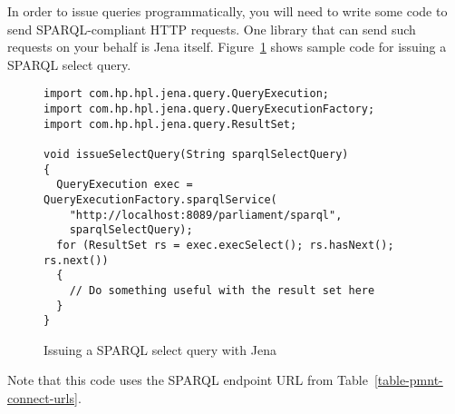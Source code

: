 In order to issue queries programmatically, you will need to write some code to send SPARQL-compliant HTTP requests.  One library that can send such requests on your behalf is Jena itself.  Figure~\ref{figure-sparql-select-query-with-jena} shows sample code for issuing a SPARQL select query.
\begin{figure}[htbp]
	\footnotesize
	\begin{verbatim}
import com.hp.hpl.jena.query.QueryExecution;
import com.hp.hpl.jena.query.QueryExecutionFactory;
import com.hp.hpl.jena.query.ResultSet;

void issueSelectQuery(String sparqlSelectQuery)
{
  QueryExecution exec = QueryExecutionFactory.sparqlService(
    "http://localhost:8089/parliament/sparql",
    sparqlSelectQuery);
  for (ResultSet rs = exec.execSelect(); rs.hasNext(); rs.next())
  {
    // Do something useful with the result set here
  }
}
	\end{verbatim}
	\caption{Issuing a SPARQL select query with Jena}
	\label{figure-sparql-select-query-with-jena}
\end{figure}
Note that this code uses the SPARQL endpoint URL from Table~\ref{table-pmnt-connect-urls}.


